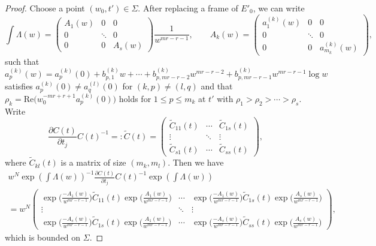 \documentclass[pdftex]{sigma}
\numberwithin{equation}{section}
\begin{document}
\begin{proof}
Choose a point $(w_0,t')\in \Sigma$.
After replacing a frame of $E'_0$,
we can write
\begin{equation*}
 \int\Lambda(w)
 =
 \begin{pmatrix}
 A_1(w) & 0 & 0 \\
 0 & \ddots & 0 \\
 0 & 0 & A_s(w)
 \end{pmatrix}\frac{1}{w^{mr-r-1}},
 \qquad
 A_k(w)
 =
 \begin{pmatrix}
 a^{(k)}_1(w) & 0 & 0 \\
 0 & \ddots & 0 \\
 0 & 0 & a^{(k)}_{m_k}(w)
 \end{pmatrix},
\end{equation*}
such that
$a^{(k)}_p(w)=a^{(k)}_p(0)+b^{(k)}_{p,1}w+\cdots
 +b^{(k)}_{p,mr-r-2}w^{mr-r-2}+b^{(k)}_{p,mr-r-1} w^{mr-r-1}\log w$
satisfies $a^{(k)}_p(0)\neq a^{(l)}_q(0)$ for $(k,p)\neq (l,q)$
and that
$
 \rho_k=\mathrm{Re}\big( w_0^{-mr+r+1} a^{(k)}_p(0) \big)
$
holds for $1\leq p\leq m_k$ at $t'$
with $\rho_1>\rho_2>\cdots>\rho_s$.
Write
\begin{equation} \label{equation: differential of transition matrix}
 \frac{\partial C(t)} {\partial t_j} C(t)^{-1}
 =:\tilde{C}(t)=
 \begin{pmatrix}
 \tilde{C}_{11}(t) & \cdots & \tilde{C}_{1s}(t) \\
 \vdots & \ddots & \vdots \\
 \tilde{C}_{s1}(t) & \cdots & \tilde{C}_{ss}(t)
 \end{pmatrix},
\end{equation}
where $\tilde{C}_{kl}(t)$ is a matrix of size $(m_k,m_l)$.
Then we have
\begin{gather} \label{equation: adjoint of differential of transition matrix}
w^N\exp \left( \int\Lambda(w) \right)^{-1} \frac{\partial C(t)} {\partial t_j}
 C(t)^{-1} \exp \left( \int\Lambda(w) \right)
 \\
=
 w^N
 \begin{pmatrix}
 \exp\big(\frac{-A_1(w)}{w^{mr-r-1}}\big)\tilde{C}_{11}(t)\exp\big(\frac{A_1(w)}{w^{mr-r-1}}\big)
 & \cdots &
 \exp\big(\frac{-A_1(w)}{w^{mr-r-1}}\big)\tilde{C}_{1s}(t)\exp\big(\frac{A_s(w)}{w^{mr-r-1}}\big)
 \\
 \vdots & \ddots & \vdots \\
 \exp\big(\frac{-A_s(w)}{w^{mr-r-1}}\big)\tilde{C}_{1s}(t)\exp\big(\frac{A_1(w)}{w^{mr-r-1}}\big)
 & \cdots &
 \exp\big(\frac{-A_s(w)}{w^{mr-r-1}}\big)\tilde{C}_{ss}(t)\exp\big(\frac{A_s(w)}{w^{mr-r-1}}\big)
 \end{pmatrix},
\nonumber
\end{gather}
which is bounded on $\Sigma$.


\end{proof}
\end{document}
